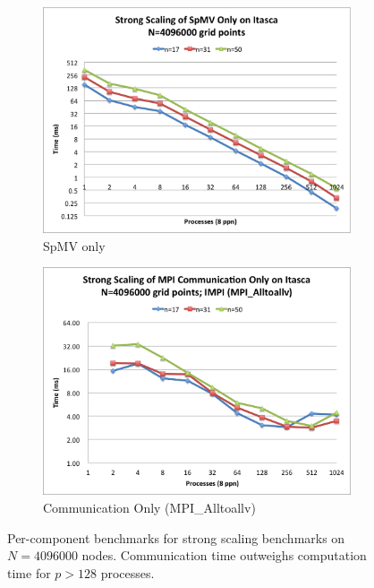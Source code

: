 \documentclass{report}
\begin{document}
\begin{figure} 
\centering
\begin{subfigure}{0.48\textwidth}
\centering
\includegraphics[width=\textwidth]{performance_content/scaling/strong_scaling_4M_regular_spmvOnly.png}
\caption{SpMV only}
\label{fig:strong_scaling_spmv_only_alltoallv_all_stencils}
\end{subfigure}
\begin{subfigure}{0.48\textwidth}
\centering
\includegraphics[width=\textwidth]{performance_content/scaling/strong_scaling_4M_regular_alltoallv_commOnly.png} \caption{Communication Only (MPI\_Alltoallv)}
\label{fig:strong_scaling_comm_only_alltoallv_all_stencils}
\end{subfigure}
\caption{Per-component benchmarks for strong scaling benchmarks on $N=4096000$ nodes. Communication time outweighs computation time for $p>128$ processes.  }
\label{fig:per_component_strong_scaling_alltoallv}
\end{figure}
\end{document}

